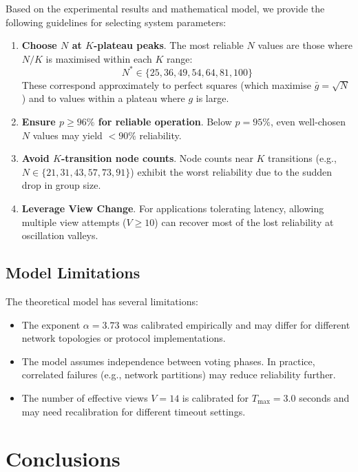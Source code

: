 \documentclass[
12pt,
oneside,
singlespacing,
parskip,
]{article}
\begin{document}
Based on the experimental results and mathematical model, we provide the following guidelines for selecting system parameters:

\begin{enumerate}
  \item \textbf{Choose $N$ at $K$-plateau peaks}. The most reliable $N$ values are those where $N/K$ is maximised within each $K$ range:
  \[
    N^* \in \{25, 36, 49, 54, 64, 81, 100\}
  \]
  These correspond approximately to perfect squares (which maximise $\bar{g} = \sqrt{N}$) and to values within a plateau where $g$ is large.

  \item \textbf{Ensure $p \geq 96\%$ for reliable operation}. Below $p = 95\%$, even well-chosen $N$ values may yield $< 90\%$ reliability.

  \item \textbf{Avoid $K$-transition node counts}. Node counts near $K$ transitions (e.g., $N \in \{21, 31, 43, 57, 73, 91\}$) exhibit the worst reliability due to the sudden drop in group size.

  \item \textbf{Leverage View Change}. For applications tolerating latency, allowing multiple view attempts ($V \geq 10$) can recover most of the lost reliability at oscillation valleys.
\end{enumerate}

\subsection{Model Limitations}

The theoretical model has several limitations:
\begin{itemize}
  \item The exponent $\alpha = 3.73$ was calibrated empirically and may differ for different network topologies or protocol implementations.
  \item The model assumes independence between voting phases. In practice, correlated failures (e.g., network partitions) may reduce reliability further.
  \item The number of effective views $V = 14$ is calibrated for $T_\mathrm{max} = 3.0$ seconds and may need recalibration for different timeout settings.
\end{itemize}

\section{Conclusions}
\label{sec:conclusions}
\end{document}
